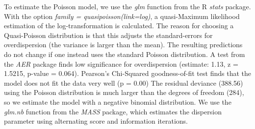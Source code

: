 \documentclass[12pt,a4paper]{article}
\begin{document}
To estimate the Poisson model, we use the \emph{glm} function from the R
\emph{stats} package. With the option \emph{family =
quasipoisson(link=log)}, a quasi-Maximum likelihood estimation of the
log-transformation is calculated. The reason for choosing a
Quasi-Poisson distribution is that this adjusts the standard-errors for
overdispersion (the variance is larger than the mean). The resulting
predictions do not change if one instead uses the standard Poisson
distribution. A test from the \emph{AER} package finds low significance
for overdispersion (estimate: 1.13, z = 1.5215, p-value = 0.064).
Pearson's Chi-Squared goodness-of-fit test finds that the model does not
fit the data very well (p = 0.00) The residual deviance (388.56) using
the Poisson distribution is much larger than the degrees of freedom
(284), so we estimate the model with a negative binomial distribution.
We use the \emph{glm.nb} function from the \emph{MASS} package, which
estimates the dispersion parameter using alternating score and
information iterations.
\end{document}
